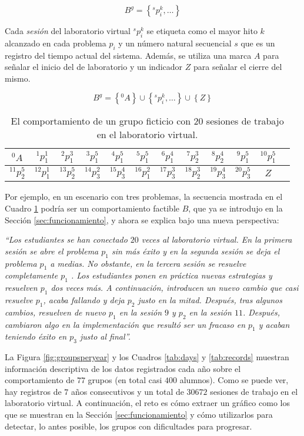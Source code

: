 \begin{equation}
B^g = \left\lbrace ^sp_i^k,\dots \right\rbrace
\end{equation}

Cada \emph{sesión} del laboratorio virtual $^sp_i^k$ se etiqueta como el mayor hito $k$ alcanzado en cada problema $p_i$ y un número natural secuencial $s$ que es un registro del tiempo actual del sistema. Además, se utiliza una marca $A$ para señalar el inicio del de laboratorio y un indicador $Z$ para señalar el cierre del mismo.

\begin{equation}
B^g = \left\lbrace ^0A \right\rbrace \cup \left\lbrace ^sp_i^k,\dots \right\rbrace \cup \left\lbrace Z \right\rbrace
\end{equation}

\begin{table}[H]
\centering
\caption{El comportamiento de un grupo ficticio con $20$ sesiones de trabajo en el laboratorio virtual.}
\label{tab:sequence}
\begin{tabular}{cccccccccccc}
$^0A$ & $^1p_1^1$ & $^2p_1^3$ & $^3p_1^5$ & $^4p_1^5$ & $^5p_1^5$ & $^6p_1^4$ & $^7p_2^3$ & $^8p_2^4$ & $^9p_1^5$ & $^{10}p_1^5$ \\ \hline
$^{11}p_2^5$  & $^{12}p_1^1$ & $^{13}p_2^5$ & $^{14}p_3^2$ & $^{15}p_3^4$ & $^{16}p_1^2$ & $^{17}p_3^3$ & $^{18}p_2^3$ & $^{19}p_3^4$ & $^{20}p_3^5$ & $Z$
\end{tabular}
\end{table}

Por ejemplo, en un escenario con tres problemas, la secuencia mostrada en el Cuadro \ref{tab:sequence} podría ser un comportamiento factible $B$, que ya se introdujo en la Sección \ref{sec:funcionamiento}, y ahora se explica bajo una nueva perspectiva:

\emph{``Los estudiantes se han conectado $20$ veces al laboratorio virtual. En la primera sesión se abre el problema $p_1$ sin más éxito y en la segunda sesión se deja el problema $p_1$ a medias. No obstante, en la tercera sesión se resuelve completamente $p_1$ . Los estudiantes ponen en práctica nuevas estrategias y resuelven $p_1$ dos veces más. A continuación, introducen un nuevo cambio que casi resuelve $p_1$, acaba fallando y deja $p_2$ justo en la mitad. Después, tras algunos cambios, resuelven de nuevo $p_1$ en la sesión $9$ y $p_2$ en la sesión $11$. Después, cambiaron algo en la implementación que resultó ser un fracaso en $p_1$ y acaban teniendo éxito en $p_3$ justo al final''.}

La Figura \ref{fig:groupsperyear} y los Cuadros \ref{tab:days} y \ref{tab:records} muestran información descriptiva de los datos registrados cada año sobre el comportamiento de $77$ grupos (en total casi $400$ alumnos). Como se puede ver, hay registros de $7$ años consecutivos y un total de $30672$ sesiones de trabajo en el laboratorio virtual. A continuación, el reto es cómo extraer un gráfico como los que se muestran en la Sección \ref{sec:funcionamiento} y cómo utilizarlos para detectar, lo antes posible, los grupos con dificultades para progresar.